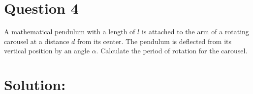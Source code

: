 \section*{Question 4}
A mathematical pendulum with a length of $l$ is attached to the arm of a rotating carousel at a distance $d$ from its center. The pendulum is deflected from its vertical position by an angle $\alpha$. Calculate the period of rotation for the carousel. 
\section*{Solution:}